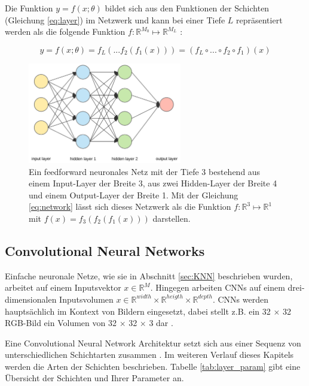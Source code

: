 Die Funktion $y = f(x; \theta)$ bildet sich aus den Funktionen der Schichten (Gleichung \ref{eq:layer}) im Netzwerk und kann bei einer Tiefe $L$ repräsentiert werden als die folgende Funktion $f :  \mathbb{R}^{M_0} \mapsto \mathbb{R}^{M_L}$ \cite{Goodfellow-et-al-2016, bauckhageInformedMachineLearning}:
 
\begin{equation}
\label{eq:network}
y = f(x; \theta)=  f_L(...f_2(f_1(x))) = (f_L \circ ... \circ f_2 \circ f_1)(x)
\end{equation}





\begin{figure}[hbt]
	\centering
	\includegraphics[width=0.6\textwidth]{images/neural_net.png}
	\caption{Ein feedforward neuronales Netz mit der Tiefe 3 bestehend aus einem Input-Layer der Breite 3, aus zwei Hidden-Layer der Breite 4 und einem Output-Layer der Breite 1. Mit der Gleichung \ref{eq:network}  lässt sich dieses Netzwerk als die Funktion $f :  \mathbb{R}^{3} \mapsto \mathbb{R}^{1}$ mit $f(x)=f_3(f_2(f_1(x)))$ darstellen. }
	\label{fig:neural_net}
\end{figure}

\subsection{Convolutional Neural Networks}

Einfache neuronale Netze, wie sie in Abschnitt \ref{sec:KNN} beschrieben wurden, arbeitet auf einem Inputsvektor $x \in \mathbb{R}^{M}$. Hingegen arbeiten CNNs auf einem drei-dimensionalen Inputsvolumen $x \in \mathbb{R}^{width} \times \mathbb{R}^{heigth} \times \mathbb{R}^{depth}$. CNNs werden hauptsächlich im Kontext von Bildern eingesetzt, dabei stellt z.B. ein 32 $\times$ 32 RGB-Bild ein Volumen von 32 $\times$ 32 $\times$ 3 dar \cite{CS231nConvolutionalNeurala}.

Eine Convolutional Neural Network Architektur setzt sich aus einer Sequenz von unterschiedlichen Schichtarten zusammen \cite{CS231nConvolutionalNeurala}. Im weiteren Verlauf dieses Kapitels werden die Arten der Schichten beschrieben. Tabelle \ref{tab:layer_param} gibt eine Übersicht der Schichten und Ihrer Parameter an.

